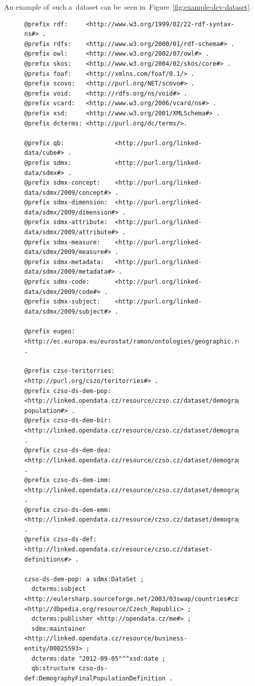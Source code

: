 An example of~such a~dataset can be~seen in~Figure~\ref{fig:example-dcv-dataset}.

\begin{figure}
\tiny\begin{verbatim}
@prefix rdf:     <http://www.w3.org/1999/02/22-rdf-syntax-ns#> .
@prefix rdfs:    <http://www.w3.org/2000/01/rdf-schema#> .
@prefix owl:     <http://www.w3.org/2002/07/owl#> .
@prefix skos:    <http://www.w3.org/2004/02/skos/core#> .
@prefix foaf:    <http://xmlns.com/foaf/0.1/> .
@prefix scovo:   <http://purl.org/NET/scovo#> .
@prefix void:    <http://rdfs.org/ns/void#> .
@prefix vcard:   <http://www.w3.org/2006/vcard/ns#> .
@prefix xsd:     <http://www.w3.org/2001/XMLSchema#> .
@prefix dcterms: <http://purl.org/dc/terms/>.

@prefix qb:              <http://purl.org/linked-data/cube#> .
@prefix sdmx:            <http://purl.org/linked-data/sdmx#> .
@prefix sdmx-concept:    <http://purl.org/linked-data/sdmx/2009/concept#> .
@prefix sdmx-dimension:  <http://purl.org/linked-data/sdmx/2009/dimension#> .
@prefix sdmx-attribute:  <http://purl.org/linked-data/sdmx/2009/attribute#> .
@prefix sdmx-measure:    <http://purl.org/linked-data/sdmx/2009/measure#> .
@prefix sdmx-metadata:   <http://purl.org/linked-data/sdmx/2009/metadata#> .
@prefix sdmx-code:       <http://purl.org/linked-data/sdmx/2009/code#> .
@prefix sdmx-subject:    <http://purl.org/linked-data/sdmx/2009/subject#> .

@prefix eugeo: <http://ec.europa.eu/eurostat/ramon/ontologies/geographic.rdf#> .

@prefix czso-teritorries:  <http://purl.org/cszo/teritorries#> .
@prefix czso-ds-dem-pop:   <http://linked.opendata.cz/resource/czso.cz/dataset/demography/final-population#> .
@prefix czso-ds-dem-bir:   <http://linked.opendata.cz/resource/czso.cz/dataset/demography/births#> .
@prefix czso-ds-dem-dea:   <http://linked.opendata.cz/resource/czso.cz/dataset/demography/deaths#> .
@prefix czso-ds-dem-imm:   <http://linked.opendata.cz/resource/czso.cz/dataset/demography/immigrants#> .
@prefix czso-ds-dem-emm:   <http://linked.opendata.cz/resource/czso.cz/dataset/demography/emmigrants#> .
@prefix czso-ds-def:       <http://linked.opendata.cz/resource/czso.cz/dataset-definitions#> .

czso-ds-dem-pop: a sdmx:DataSet ;
  dcterms:subject <http://eulersharp.sourceforge.net/2003/03swap/countries#cz>, <http://dbpedia.org/resource/Czech_Republic> ;
  dcterms:publisher <http://opendata.cz/me#> ;
  sdmx:maintainer <http://linked.opendata.cz/resource/business-entity/00025593> ;
  dcterms:date "2012-09-05"^^xsd:date ;
  qb:structure czso-ds-def:DemographyFinalPopulationDefinition .
  

\end{verbatim}
\end{figure}
